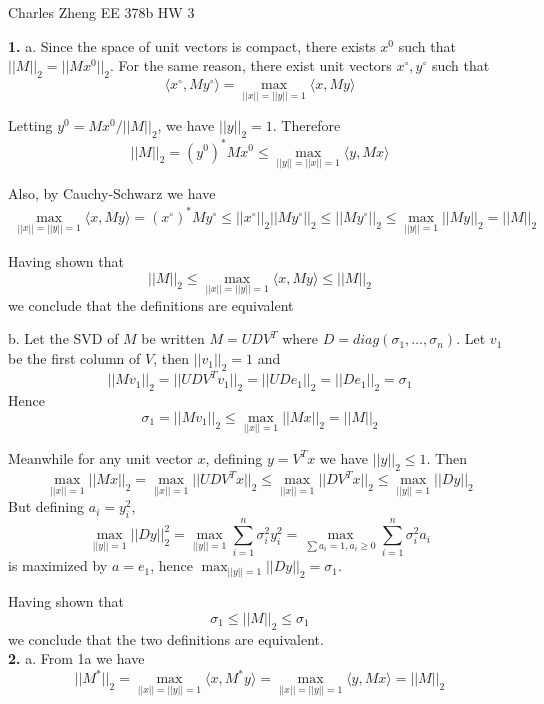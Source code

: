 \documentclass[11pt]{article}
\begin{document}
\newcommand{\tr}{\text{tr}}
\newcommand{\E}{\textbf{E}}
\newcommand{\diag}{\text{diag}}
\newcommand{\argmax}{\text{argmax}}
\newcommand{\Cov}{\text{Cov}}
\newcommand{\Var}{\text{Var}}
\renewcommand{\thefootnote}{\fnsymbol{footnote}}

\begin{center}
\noindent Charles Zheng EE 378b HW 3
\end{center}

\noindent\textbf{1.}
a.
Since the space of unit vectors is compact,
there exists $x^0$ such that $||M||_2 = ||Mx^0||_2$.
For the same reason, there exist unit vectors $x^\circ, y^\circ$ such that
\[
\langle x^\circ, M y^\circ \rangle = \max_{||x|| = ||y|| = 1} \langle x, My \rangle
\]

Letting $y^0 = Mx^0/||M||_2$, we have $||y||_2 = 1$.
Therefore
\[
||M||_2 = (y^0)^* M x^0 \leq \max_{||y||=||x||=1} \langle y, Mx \rangle
\]

Also, by Cauchy-Schwarz we have 
\begin{align*}
\max_{||x|| = ||y|| = 1} \langle x, My \rangle
= (x^\circ)^* M y^\circ
\leq ||x^\circ||_2 ||My^\circ||_2 \leq ||My^\circ||_2 
\leq \max_{||y||=1} ||My||_2 = ||M||_2
\end{align*}

Having shown that \[||M||_2 \leq \max_{||x|| = ||y|| = 1} \langle x, My \rangle \leq ||M||_2\]
we conclude that the definitions are equivalent

b.  Let the SVD of $M$ be written $M = UDV^T$ where $D =
diag(\sigma_1,\hdots, \sigma_n)$.
Let $v_1$ be the first column of $V$, then $||v_1||_2 = 1$ and
\[
||Mv_1||_2 = ||UDV^T v_1||_2 = ||UD e_1||_2 = ||De_1||_2 = \sigma_1
\]
Hence
\[
\sigma_1 = ||Mv_1||_2 \leq \max_{||x|| = 1} ||Mx||_2 = ||M||_2
\]

Meanwhile for any unit vector $x$, defining $y = V^T x$ we have $||y||_2 \leq 1$.
Then
\[
\max_{||x||=1} ||Mx||_2 = \max_{||x|| = 1} ||UDV^T x||_2
\leq \max_{||x|| = 1} ||DV^T x||_2 \leq \max_{||y|| = 1} ||Dy||_2
\]
But defining $a_i = y_i^2$,
\[
\max_{||y||=1} ||Dy||_2^2 = \max_{||y||=1} \sum_{i=1}^n \sigma_i^2 y_i^2
= \max_{\sum a_i = 1, a_i \geq 0} \sum_{i=1}^n \sigma_i^2 a_i
\]
is maximized by $a = e_1$, hence $\max_{||y|| = 1} ||Dy||_2 = \sigma_1$.

Having shown that
\[
\sigma_1 \leq ||M||_2 \leq \sigma_1
\]
we conclude that the two definitions are equivalent.\\

\noindent\textbf{2.}
a.
From 1a we have
\[
||M^*||_2 = \max_{||x||=||y||=1} \langle x, M^* y \rangle
= \max_{||x||=||y||=1} \langle y, M x \rangle = ||M||_2
\]
\end{document}
